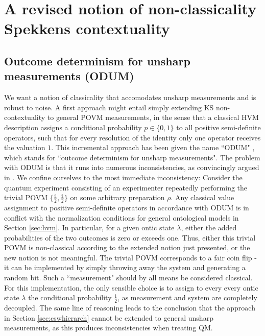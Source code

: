 \chapter[A revised notion of non-classicality \\ Spekkens contextuality]{A revised notion of non-classicality \\ \huge{Spekkens contextuality}}
\label{sec:spekkcont}
\section{Outcome determinism for unsharp measurements (ODUM)}
\label{sec:odum}
We want a notion of classicality that accomodates unsharp measurements and is robust to noise. A first approach might entail simply extending KS non-contextuality to general POVM measurements, in the sense that a classical HVM description assigns a conditional probability  $p\in\{0,1\}$ to all positive semi-definite operators, such that for every resolution of the identity only one operator receives the valuation $1$. This incremental approach has been given the name ``ODUM" \cite{Spekkens2014}, which stands for ``outcome determinism for unsharp measurements". The problem with ODUM is that it runs into numerous inconsistencies, as convincingly argued in \cite{Spekkens2014}. We confine ourselves to the most immediate inconsistency: Consider the quantum experiment consisting of an experimenter repeatedly performing the trivial POVM $\{\frac{\mathbb{1}}{2},\frac{\mathbb{1}}{2}\}$ on some arbitrary preparation $\rho$. Any classical value assignment to positive semi-definite operators in accordance with ODUM is in conflict with the normalization conditions for general ontological models in Section \ref{sec:hvm}. In particular, for a given ontic state $\lambda$, either the added probabilities of the two outcomes is zero or exceeds one. Thus, either this trivial POVM is non-classical according to the extended notion just presented, or the new notion is not meaningful. The trivial POVM corresponds to a fair coin flip - it can be implemented by simply throwing away the system and generating a random bit. Such a ``measurement" should by all means be considered classical. For this implementation, the only sensible choice is to assign to every every ontic state $\lambda$ the conditional probability $\frac{1}{2}$, as measurement and system are completely decoupled. The same line of reasoning leads to the conclusion that the approach in Section \ref{sec:cswhierarch} cannot be extended to general unsharp measurements, as this produces inconsistencies when treating QM.

